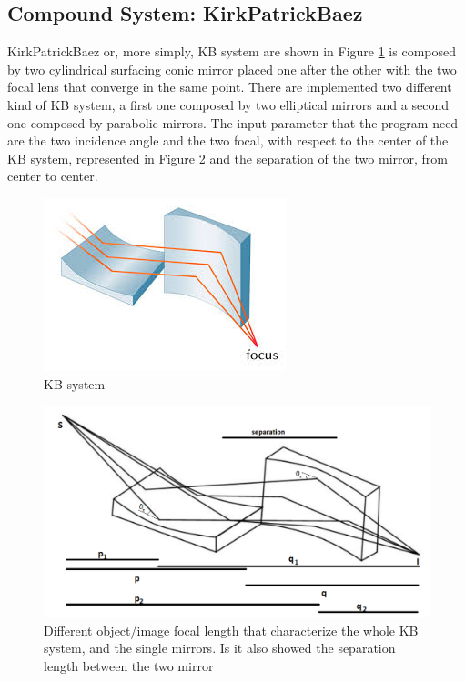 \subsection{Compound System: KirkPatrickBaez}
KirkPatrickBaez or, more simply, KB system are shown in Figure \ref{fig: KB} is composed by two cylindrical surfacing conic mirror placed one after the other with the two focal lens that converge in the same point. There are implemented two different kind of KB system, a first one composed by two elliptical mirrors and a second one composed by parabolic mirrors. The input parameter that the program need are the two incidence angle and the two focal, with respect to the center of the KB system, represented in Figure \ref{fig: KB1} and the separation of the two mirror, from center to center.
\begin{figure}[H]
%
\centering
%
\includegraphics[width=.4\textwidth]{Immagini/Chapter3/KB}
%
\caption{KB system}
%
\label{fig: KB}
%
\end{figure}
\begin{figure}[H]
%
%
\includegraphics[width=.8\textwidth]{Immagini/Chapter3/KB1}
%
\caption{Different object/image focal length that characterize the whole KB system, and the single mirrors. Is it also showed the separation length between the two mirror}
%
\label{fig: KB1}
%
\end{figure}
%
%
%
